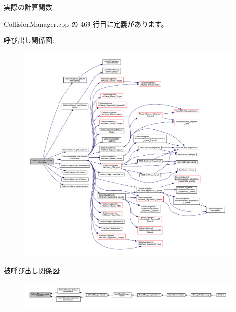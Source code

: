 実際の計算関数 



 Collision\+Manager.\+cpp の 469 行目に定義があります。

呼び出し関係図\+:\nopagebreak
\begin{figure}[H]
\begin{center}
\leavevmode
\includegraphics[width=350pt]{class_collision_manager_ab7a212529ce17392d2ca120153318090_cgraph}
\end{center}
\end{figure}
被呼び出し関係図\+:
\nopagebreak
\begin{figure}[H]
\begin{center}
\leavevmode
\includegraphics[width=350pt]{class_collision_manager_ab7a212529ce17392d2ca120153318090_icgraph}
\end{center}
\end{figure}
\mbox{\label{class_collision_manager_a42be7a26321110f5daaf1828da32f667}} 
